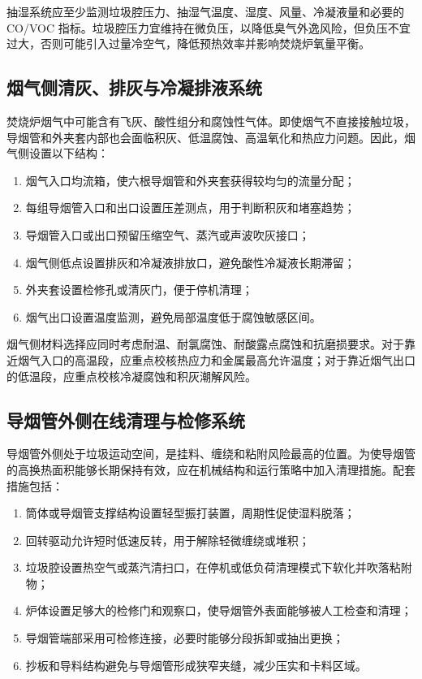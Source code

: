 \documentclass[UTF8,openany,zihao=-4,oneside]{ctexbook}
\providecommand{\tightlist}{\setlength{\itemsep}{0pt}\setlength{\parskip}{0pt}}
\begin{document}
抽湿系统应至少监测垃圾腔压力、抽湿气温度、湿度、风量、冷凝液量和必要的 CO/VOC 指标。垃圾腔压力宜维持在微负压，以降低臭气外逸风险，但负压不宜过大，否则可能引入过量冷空气，降低预热效率并影响焚烧炉氧量平衡。

\subsection{烟气侧清灰、排灰与冷凝排液系统}\label{ux70dfux6c14ux4fa7ux6e05ux7070ux6392ux7070ux4e0eux51b7ux51ddux6392ux6db2ux7cfbux7edf}

焚烧炉烟气中可能含有飞灰、酸性组分和腐蚀性气体。即使烟气不直接接触垃圾，导烟管和外夹套内部也会面临积灰、低温腐蚀、高温氧化和热应力问题。因此，烟气侧设置以下结构：

\begin{enumerate}
\def\labelenumi{\arabic{enumi}.}
\tightlist
\item
  烟气入口均流箱，使六根导烟管和外夹套获得较均匀的流量分配；
\item
  每组导烟管入口和出口设置压差测点，用于判断积灰和堵塞趋势；
\item
  导烟管入口或出口预留压缩空气、蒸汽或声波吹灰接口；
\item
  烟气侧低点设置排灰和冷凝液排放口，避免酸性冷凝液长期滞留；
\item
  外夹套设置检修孔或清灰门，便于停机清理；
\item
  烟气出口设置温度监测，避免局部温度低于腐蚀敏感区间。
\end{enumerate}

烟气侧材料选择应同时考虑耐温、耐氯腐蚀、耐酸露点腐蚀和抗磨损要求。对于靠近烟气入口的高温段，应重点校核热应力和金属最高允许温度；对于靠近烟气出口的低温段，应重点校核冷凝腐蚀和积灰潮解风险。

\subsection{导烟管外侧在线清理与检修系统}\label{ux5bfcux70dfux7ba1ux5916ux4fa7ux5728ux7ebfux6e05ux7406ux4e0eux68c0ux4feeux7cfbux7edf}

导烟管外侧处于垃圾运动空间，是挂料、缠绕和粘附风险最高的位置。为使导烟管的高换热面积能够长期保持有效，应在机械结构和运行策略中加入清理措施。配套措施包括：

\begin{enumerate}
\def\labelenumi{\arabic{enumi}.}
\tightlist
\item
  筒体或导烟管支撑结构设置轻型振打装置，周期性促使湿料脱落；
\item
  回转驱动允许短时低速反转，用于解除轻微缠绕或堆积；
\item
  垃圾腔设置热空气或蒸汽清扫口，在停机或低负荷清理模式下软化并吹落粘附物；
\item
  炉体设置足够大的检修门和观察口，使导烟管外表面能够被人工检查和清理；
\item
  导烟管端部采用可检修连接，必要时能够分段拆卸或抽出更换；
\item
  抄板和导料结构避免与导烟管形成狭窄夹缝，减少压实和卡料区域。
\end{enumerate}
\end{document}
